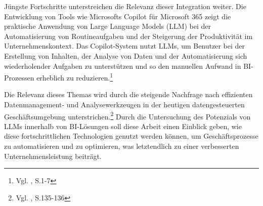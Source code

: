 Jüngste Fortschritte unterstreichen die Relevanz dieser Integration weiter. Die Entwicklung von Tools wie Microsofts Copilot für Microsoft 365 zeigt die praktische Anwendung von Large Language Models (LLM) bei der Automatisierung von Routineaufgaben und der Steigerung der Produktivität im Unternehmenskontext. Das Copilot-System nutzt LLMs, um Benutzer bei der Erstellung von Inhalten, der Analyse von Daten und der Automatisierung sich wiederholender Aufgaben zu unterstützen und so den manuellen Aufwand in BI-Prozessen erheblich zu reduzieren.\footnote{Vgl. \cite{Spataro2024}, S.1-7}

Die Relevanz dieses Themas wird durch die steigende Nachfrage nach effizienten Datenmanagement- und Analysewerkzeugen in der heutigen datengesteuerten Geschäftsumgebung unterstrichen.\footnote{Vgl. \cite{Syam2018}, S.135-136} Durch die Untersuchung des Potenzials von LLMs innerhalb von BI-Lösungen soll diese Arbeit einen Einblick geben, wie diese fortschrittlichen Technologien genutzt werden können, um Geschäftsprozesse zu automatisieren und zu optimieren, was letztendlich zu einer verbesserten Unternehmensleistung beiträgt.

\newpage